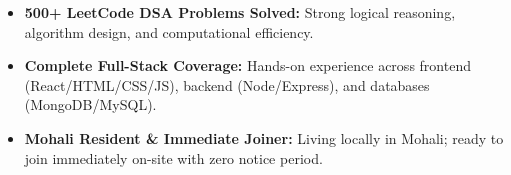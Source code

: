 \documentclass[a4paper,10pt]{article}
\begin{document}
\begin{itemize}

    \item \textbf{500+ LeetCode DSA Problems Solved:} Strong logical reasoning, algorithm design, and computational efficiency.

    \item \textbf{Complete Full-Stack Coverage:} Hands-on experience across frontend (React/HTML/CSS/JS), backend (Node/Express), and databases (MongoDB/MySQL).

    \item \textbf{Mohali Resident \& Immediate Joiner:} Living locally in Mohali; ready to join immediately on-site with zero notice period.

\end{itemize}

\end{document}
